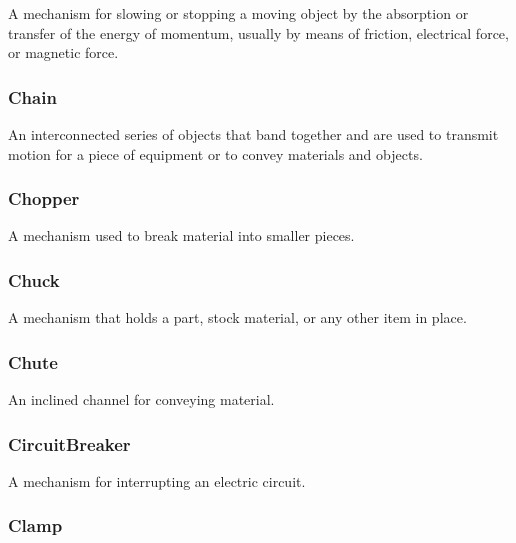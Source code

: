 A mechanism for slowing or stopping a moving object by the absorption or transfer of the energy of momentum, usually by means of friction, electrical force, or magnetic force.

\FloatBarrier

\subsubsection{Chain}
  \label{sec:Chain}



An interconnected series of objects that band together and are used to transmit motion for a piece of equipment or to convey materials and objects.

\FloatBarrier

\subsubsection{Chopper}
  \label{sec:Chopper}



A mechanism used to break material into smaller pieces.

\FloatBarrier

\subsubsection{Chuck}
  \label{sec:Chuck}



A mechanism that holds a part, stock material, or any other item in place.

\FloatBarrier

\subsubsection{Chute}
  \label{sec:Chute}



An inclined channel for conveying material.

\FloatBarrier

\subsubsection{CircuitBreaker}
  \label{sec:CircuitBreaker}



A mechanism for interrupting an electric circuit.

\FloatBarrier

\subsubsection{Clamp}
  \label{sec:Clamp}



